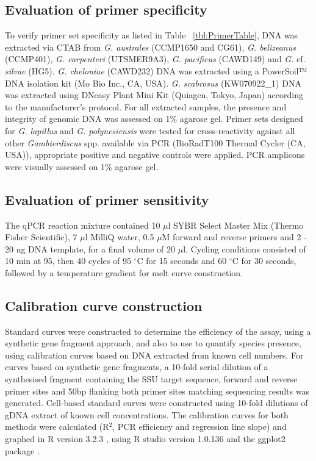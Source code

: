 \documentclass[12pt]{article}
\begin{document}
\subsection*{Evaluation of primer specificity}
To verify primer set specificity as listed in Table ~\ref{tbl:PrimerTable}, DNA was extracted via CTAB from \emph{G. australes} (CCMP1650 and CG61), \emph{G. belizeanus} (CCMP401), \emph{G. carpenteri} (UTSMER9A3), \emph{G. pacificus} (CAWD149) and \emph{G.} cf. \emph{silvae} (HG5). \emph{G. cheloniae} (CAWD232) DNA was extracted using a PowerSoil™ DNA isolation kit (Mo Bio Inc., CA, USA). \emph{G. scabrosus} (KW070922\_1) DNA was extracted using DNeasy Plant Mini Kit (Quiagen, Tokyo, Japan) according to the manufacturer's protocol. For all extracted samples, the presence and integrity of genomic DNA was assessed on 1\% agarose gel. Primer sets designed for \emph{G. lapillus} and \emph{G. polynesiensis} were tested for cross-reactivity against all other \emph{Gambierdiscus} spp. available via PCR (BioRadT100 Thermal Cycler (CA, USA)), appropriate positive and negative controls were applied. PCR amplicons were visually assessed on 1\% agarose gel.


\subsection*{Evaluation of primer sensitivity}
The qPCR reaction mixture contained 10 $\mu$l SYBR Select Master Mix (Thermo Fisher Scientific), 7 $\mu$l MilliQ water, 0.5 $\mu$M forward and reverse primers and 2 - 20 ng DNA template, for a final volume of 20 $\mu$l. Cycling conditions consisted of 10 min at 95, then 40 cycles of 95 $^{\circ}$C for 15 seconds and 60 $^{\circ}$C for 30 seconds, followed by a temperature gradient for melt curve construction.
\subsection*{Calibration curve construction}
Standard curves were constructed to determine the efficiency of the assay, using a synthetic gene fragment approach, and also to use to quantify species presence, using calibration curves based on DNA extracted from known cell numbers. For curves based on synthetic gene fragments, a 10-fold serial dilution of a synthesised fragment containing the SSU target sequence, forward and reverse primer sites and 50bp flanking both primer sites matching sequencing results was generated. Cell-based standard curves were constructed using 10-fold dilutions of gDNA extract of known cell concentrations.
The calibration curves for both methods were calculated (R$^{2}$, PCR efficiency and regression line slope) and graphed in R version 3.2.3 \citep{rlang}, using R studio version 1.0.136 \citep{rstudio} and the ggplot2 package \citep{ggplot2}. 
\end{document}

